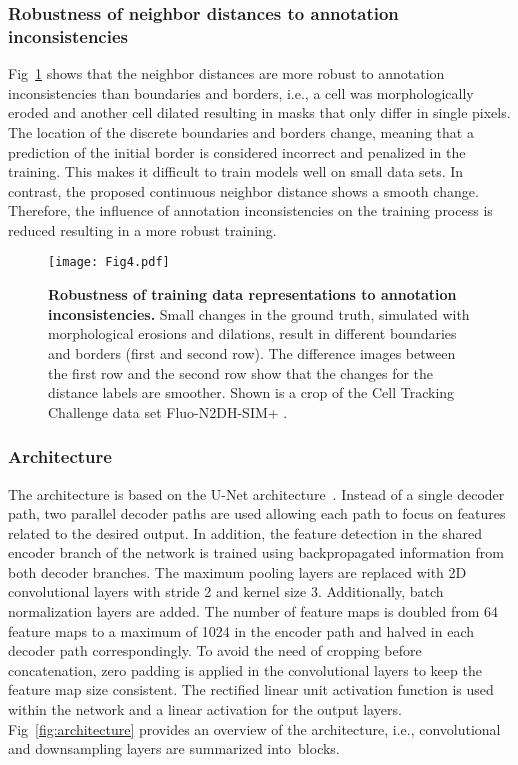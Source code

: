 \documentclass[10pt,letterpaper]{article}
\begin{document}
\subsubsection*{Robustness of neighbor distances to annotation inconsistencies}
Fig~\ref{fig:trainingDataShift} shows that the neighbor distances are more robust to annotation inconsistencies than boundaries and borders, i.e., a cell was morphologically eroded and another cell dilated resulting in masks that only differ in single pixels. The location of the discrete boundaries and borders change, meaning that a prediction of the initial border is considered incorrect and penalized in the training. This makes it difficult to train models well on small data sets. In contrast, the proposed continuous neighbor distance shows a smooth change. Therefore, the influence of annotation inconsistencies on the training process is reduced resulting in a more robust training.
\begin{figure}
\begin{adjustwidth}{-2.25in}{0in}
\centering
\texttt{[image: Fig4.pdf]}
\caption{\textbf{Robustness of training data representations to annotation inconsistencies.} Small changes in the ground truth, simulated with morphological erosions and dilations, result in different boundaries and borders (first and second row). The difference images between the first row and the second row show that the changes for the distance labels are smoother. Shown is a crop of the Cell Tracking Challenge data set Fluo-N2DH-SIM+ \cite{Ulman2017, Maska2014}.}
\label{fig:trainingDataShift}
\end{adjustwidth}
\end{figure}

\subsubsection*{Architecture}
The architecture is based on the U-Net architecture~\cite{Ronneberger2015}. Instead of a single decoder path, two parallel decoder paths are used allowing each path to focus on features related to the desired output. In addition, the feature detection in the shared encoder branch of the network is trained using backpropagated information from both decoder branches. The maximum pooling layers are replaced with 2D convolutional layers with stride 2 and kernel size 3. Additionally, batch normalization layers are added. The number of feature maps is doubled from 64 feature maps to a maximum of 1024 in the encoder path and halved in each decoder path correspondingly. To avoid the need of cropping before concatenation, zero padding is applied in the convolutional layers to keep the feature map size consistent. The rectified linear unit activation function is used within the network and a linear activation for the output layers. Fig~\ref{fig:architecture} provides an overview of the architecture, i.e., convolutional and downsampling layers are summarized into~blocks.
\end{document}
